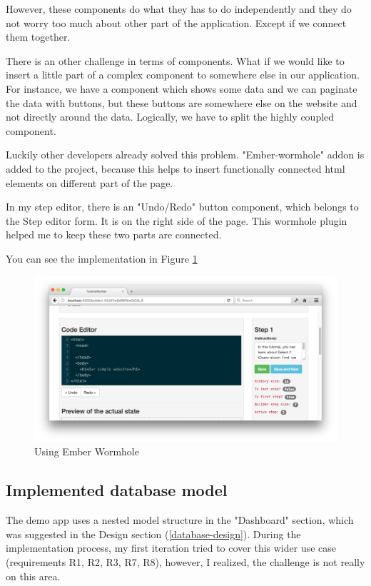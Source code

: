 \documentclass[11pt, a4paper, oneside, openright, medskipamount]{report}
\begin{document}
However, these components do what they has to do independently and they do not worry too much about other part of the application. Except if we connect them together.

There is an other challenge in terms of components. What if we would like to insert a little part of a complex component to somewhere else in our application. For instance, we have a component which shows some data and we can paginate the data with buttons, but these buttons are somewhere else on the website and not directly around the data. Logically, we have to split the highly coupled component.

Luckily other developers already solved this problem. "Ember-wormhole" addon is added to the project, because this helps to insert functionally connected html elements on different part of the page.

In my step editor, there is an "Undo/Redo" button component, which belongs to the Step editor form. It is on the right side of the page. This wormhole plugin helped me to keep these two parts are connected.

You can see the implementation in Figure \ref{fig:wormhole}

\begin{figure}[ht]
\centering
\includegraphics[width=1\textwidth]{assets/wormhole-screenshot.png}
\caption{Using Ember Wormhole}
\label{fig:wormhole}
\end{figure}

\subsection{Implemented database model} \label{database-implementation}

The demo app uses a nested model structure in the "Dashboard" section, which was suggested in the Design section (\ref{database-design}). During the implementation process, my first iteration tried to cover this wider use case (requirements R1, R2, R3, R7, R8), however, I realized, the challenge is not really on this area.
\end{document}
